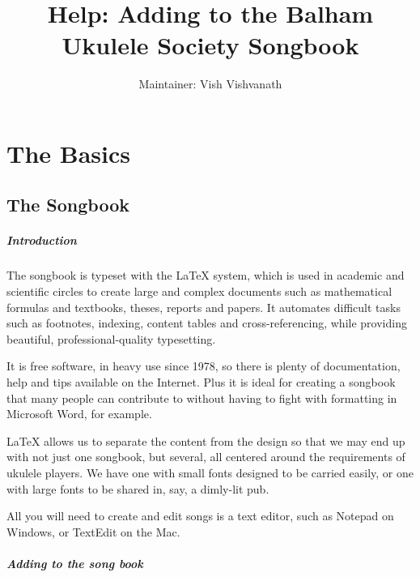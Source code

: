 \documentclass[10pt,a4paper]{book}
\title{Help: Adding to the Balham Ukulele Society Songbook}
\author{Maintainer: Vish Vishvanath}
\begin{document}
\pagestyle{plain}
\maketitle
\restoregeometry

\dominitoc
\dominilof
\dominilot
\tableofcontents

\setcounter{page}{1}

\chapter{The Basics}\label{ch:the_basics}
\section{The Songbook} %
\label{sec:the_songbook}

\paragraph{Introduction} %
\label{par:introduction}

The songbook is typeset with the LaTeX system, which is used in academic and scientific circles to create large and complex documents such as mathematical formulas and textbooks, theses, reports and papers. It automates difficult tasks such as footnotes, indexing, content tables and cross-referencing, while providing beautiful, professional-quality typesetting.

It is free software, in heavy use since 1978, so there is plenty of documentation, help and tips available on the Internet. Plus it is ideal for creating a songbook that many people can contribute to without having to fight with formatting in Microsoft Word, for example.

LaTeX allows us to separate the content from the design so that we may end up with not just one songbook, but several, all centered around the requirements of ukulele players. We have one with small fonts designed to be carried easily, or one with large fonts to be shared in, say, a dimly-lit pub.

All you will need to create and edit songs is a text editor, such as Notepad on Windows, or TextEdit on the Mac.


\paragraph{Adding to the song book} %
\label{par:adding_to_the_song_book}
\end{document}
